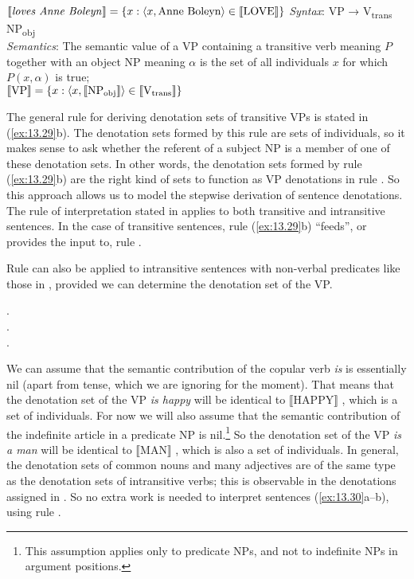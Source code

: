 \ea \label{ex:13.29}
\ea $\llbracket\text{\textit{loves Anne Boleyn}}\rrbracket  = \{x: \langle x, \text{Anne Boleyn}\rangle \in \llbracket\text{LOVE}\rrbracket \}$
\ex \textit{Syntax}: VP  →  V\textsubscript{trans}  NP\textsubscript{obj}\\
\textit{Semantics}: The semantic value of a VP containing a transitive verb meaning $P$ together with an object NP meaning $\alpha$ is the set of all individuals $x$ for which $P(x,\alpha)$ is true;\\
{}$\llbracket\text{VP}\rrbracket  =  \{x: \langle x, \llbracket\text{NP\textsubscript{obj}}\rrbracket \rangle \in \llbracket\text{V\textsubscript{trans}}\rrbracket \}$
\z \z


The general rule for deriving denotation sets of transitive VPs is stated in (\ref{ex:13.29}b). The denotation sets formed by this rule are sets of individuals, so it makes sense to ask whether the referent of a subject NP is a member of one of these denotation sets. In other words, the denotation sets formed by rule (\ref{ex:13.29}b) are the right kind of sets to function as VP denotations in rule . So this approach allows us to model the stepwise derivation of sentence denotations. The rule of interpretation stated in  applies to both transitive and intransitive sentences. In the case of transitive sentences, rule (\ref{ex:13.29}b) “feeds”, or provides the input to, rule .



Rule  can also be applied to intransitive sentences with non-verbal predicates like those in , provided we can determine the denotation set of the VP.


\ea \label{ex:13.30}
.\\
.\\
.
                       \z
\z


We can assume that the semantic contribution of the copular verb \textit{is} is essentially nil (apart from tense, which we are ignoring for the moment). That means that the denotation set of the VP \textit{is happy} will be identical to $\llbracket\text{HAPPY}\rrbracket$ , which is a set of individuals. For now we will also assume that the semantic contribution of the indefinite article in a predicate NP is nil.\footnote{This assumption applies only to predicate NPs, and not to indefinite NPs in argument positions.} So the denotation set of the VP \textit{is a man} will be identical to $\llbracket\text{MAN}\rrbracket$ , which is also a set of individuals. In general, the denotation sets of common nouns and many adjectives are of the same type as the denotation sets of intransitive verbs; this is observable in the denotations assigned in . So no extra work is needed to interpret sentences (\ref{ex:13.30}a--b), using rule .



